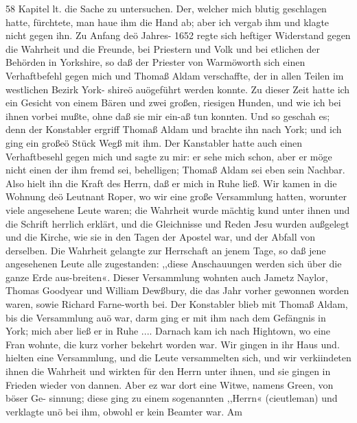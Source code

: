 58 Kapitel lt.
die Sache zu untersuchen. Der, welcher mich blutig geschlagen
hatte, fürchtete, man haue ihm die Hand ab; aber ich vergab
ihm und klagte nicht gegen ihn.
Zu Anfang deö Jahres- 1652 regte sich heftiger Widerstand
gegen die Wahrheit und die Freunde, bei Priestern und Volk
und bei etlichen der Behörden in Yorkshire, so daß der Priester
von Warmöworth sich einen Verhaftbefehl gegen mich und Thomaß
Aldam verschaffte, der in allen Teilen im westlichen Bezirk York-
shireö auögeführt werden konnte. Zu dieser Zeit hatte ich ein
Gesicht von einem Bären und zwei großen, riesigen Hunden, und
wie ich bei ihnen vorbei mußte, ohne daß sie mir ein-aß tun
konnten. Und so geschah es; denn der Konstabler ergriff Thomaß
Aldam und brachte ihn nach York; und ich ging ein großeö Stück
Wegß mit ihm. Der Kanstabler hatte auch einen Verhaftbesehl
gegen mich und sagte zu mir: er sehe mich schon, aber er möge
nicht einen der ihm fremd sei, behelligen; Thomaß Aldam sei
eben sein Nachbar. Also hielt ihn die Kraft des Herrn, daß er
mich in Ruhe ließ. Wir kamen in die Wohnung deö Leutnant
Roper, wo wir eine große Versammlung hatten, worunter viele
angesehene Leute waren; die Wahrheit wurde mächtig kund
unter ihnen und die Schrift herrlich erklärt, und die Gleichnisse
und Reden Jesu wurden außgelegt und die Kirche, wie sie in den
Tagen der Apostel war, und der Abfall von derselben. Die
Wahrheit gelangte zur Herrschaft an jenem Tage, so daß jene
angesehenen Leute alle zugestanden: ,,diese Anschauungen werden
sich über die ganze Erde aus-breiten«. Dieser Versammlung
wohnten auch Jametz Naylor, Thomas Goodyear und William
Dewßbury, die das Jahr vorher gewonnen worden waren, sowie
Richard Farne-worth bei. Der Konstabler blieb mit Thomaß
Aldam, bis die Versammlung auö war, darm ging er mit ihm
nach dem Gefängnis in York; mich aber ließ er in Ruhe ....
Darnach kam ich nach Hightown, wo eine Fran wohnte, die
kurz vorher bekehrt worden war. Wir gingen in ihr Haus und.
hielten eine Versammlung, und die Leute versammelten sich, und
wir verkiindeten ihnen die Wahrheit und wirkten für den Herrn
unter ihnen, und sie gingen in Frieden wieder von dannen.
Aber ez war dort eine Witwe, namens Green, von böser Ge-
sinnung; diese ging zu einem sogenannten ,,Herrn« (cieutleman)
und verklagte unö bei ihm, obwohl er kein Beamter war. Am


